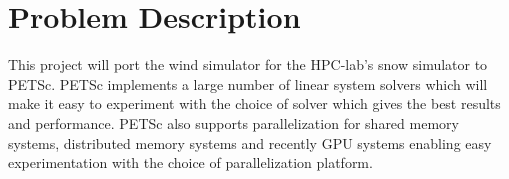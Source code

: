 \section*{Problem Description}

This project will port the wind simulator for the HPC-lab's snow simulator to 
PETSc. PETSc implements a large number of linear system solvers which will make 
it easy to experiment with the choice of solver which gives the best results and 
performance. PETSc also supports parallelization for shared memory systems, 
distributed memory systems and recently GPU systems enabling easy experimentation 
with the choice of parallelization platform. 